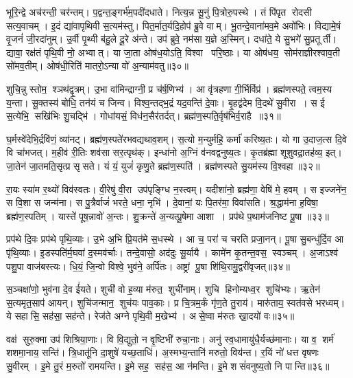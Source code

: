 भूरि॒न्द्वे अच॑रन्ती॒ चर॑न्तम्।
प॒द्वन्त॒ङ्गर्भ॑म॒पदी॑दधाते।
नित्य॒न्न सू॒नुं पि॒त्रोरु॒पस्थे।
तं पि॑पृत रोदसी सत्य॒वाचम्।
इ॒दं द्या॑वापृथिवी स॒त्यम॑स्तु।
पित॒र्मात॒र्यदि॒होप॑ ब्रु॒वे वाम्।
भू॒तन्दे॒वाना॑मव॒मे अवो॑भिः।
विद्यामे॒षं वृ॒जनं॑ जी॒रदा॑नुम्।
उ॒र्वी पृ॒थ्वी ब॑हु॒ले दू॒रे अ॑न्ते।
उप॑ ब्रुवे॒ नम॑सा य॒ज्ञे अ॒स्मिन्।
दधा॑ते॒ ये सु॒भगे॑ सु॒प्रतूर्ती।
द्यावा॒ रक्ष॑तं पृथि॒वी नो॒ अभ्वात्।
या जा॒ता ओष॑ध॒योऽति॒ विश्वा परि॒ष्ठाः।
या ओष॑धय॒ सोम॑राज्ञीरश्वाव॒ती सो॑मव॒तीम्।
ओष॑धी॒रिति॑ मातरो॒ऽन्या वो॑ अ॒न्याम॑वतु॥३०॥\anuvakamend[ह॒विर्नो॑ दाद्भभूव रा॒तिं पू॒र्वहू॑ताव॒र्कैरै॑रद॒स्मिन्पञ्च॑ च]

शुचि॒न्नु स्तोम॒ श्ञथ॑द्वृ॒त्रम्।
उ॒भा वा॑मिन्द्राग्नी॒ प्र च॑र्\mbox{}ष॒णिभ्य॑।
आ वृ॑त्रहणा गी॒र्भिर्विप्र॑।
ब्रह्म॑णस्पते॒ त्वम॒स्य य॒न्ता।
सू॒क्तस्य॑ बोधि॒ तन॑यं च जिन्व।
विश्व॒न्तद्भ॒द्रं यद॒वन्ति॑ दे॒वाः।
बृ॒हद्व॑देम वि॒दथे॑ सु॒वीरा।
स ई स॒त्येभि॒ सखि॑भिः शु॒चद्भि॑।
गोधा॑यसं॒ विध॑न॒सैर॑तर्दत्।
ब्रह्म॑ण॒स्पति॒र्वृष॑भिर्व॒राहै॥३१॥

घ॒र्मस्वे॑देभि॒र्द्रवि॑णं॒ व्या॑नट्।
ब्रह्म॑ण॒स्पते॑रभवद्यथाव॒शम्।
स॒त्यो म॒न्युर्महि॒ कर्मा॑ करिष्य॒तः।
यो गा उ॒दाज॒त्स दि॒वे वि चा॑भजत्।
म॒हीव॑ री॒तिः शव॑सा सर॒त्पृथ॑क्।
इन्धा॑नो अ॒ग्निं व॑नवद्वनुष्य॒तः।
कृ॒तब्र॑ह्मा शूशुवद्रा॒तह॑व्य॒ इत्।
जा॒तेन॑ जा॒तमति॒सृत्प्र सृसते।
यं यं॒ युजं॑ कृणु॒ते ब्रह्म॑ण॒स्पति॑।
ब्रह्म॑णस्पते सु॒यम॑स्य वि॒श्वहा॥३२॥

रा॒यः स्या॑म र॒थ्यो॑ विव॑स्वतः।
वी॒रेषु॑ वी॒रा उप॑पृङ्ग्धि न॒स्त्वम्।
यदीशा॑नो॒ ब्रह्म॑णा॒ वेषि॑ मे॒ हवम्।
स इज्जने॑न॒ स वि॒शा स जन्म॑ना।
स पु॒त्रैर्वाजं॑ भरते॒ धना॒ नृभि॑।
दे॒वानां॒ यः पि॒तर॑मा॒ विवा॑सति।
श्र॒द्धाम॑ना ह॒विषा॒ ब्रह्म॑ण॒स्पतिम्।
यास्ते॑ पूष॒न्नावो॑ अ॒न्तः।
शु॒क्रन्ते॑ अ॒न्यत्पू॒षेमा आशा।
प्रप॑थे प॒थाम॑जनिष्ट पू॒षा ॥३३॥

प्रप॑थे दि॒वः प्रप॑थे पृथि॒व्याः।
उ॒भे अ॒भि प्रि॒यत॑मे स॒धस्थे।
आ च॒ परा॑ च चरति प्रजा॒नन्।
पू॒षा सु॒बन्धु॑र्दि॒व आ पृ॑थि॒व्याः।
इ॒डस्पति॑र्म॒घवा॑ द॒स्मव॑र्चाः।
तन्दे॒वासो॒ अद॑दुः सू॒र्यायै।
कामे॑न कृ॒तन्त॒वस॒ स्वञ्चम्।
अ॒जाऽश्व॑ पशु॒पा वाज॑बस्त्यः।
धि॒यं॒ जि॒न्वो विश्वे॒ भुव॑ने॒ अर्पि॑तः।
अष्ट्रां पू॒षा शि॑थि॒रामु॒द्वरी॑वृजत्॥३४॥

स॒ञ्चक्षा॑णो॒ भुव॑ना दे॒व ई॑यते।
शुची॑ वो ह॒व्या म॑रुत॒ शुची॑नाम्।
शुचि हिनोम्यध्व॒र शुचि॑भ्यः।
ऋ॒तेन॑ स॒त्यमृत॒साप॑ आयन्।
शुचि॑जन्मान॒ शुच॑यः पाव॒काः।
प्र चि॒त्रम॒र्कं गृ॑ण॒ते तु॒राय॑।
मारु॑ताय॒ स्वत॑वसे भरध्वम्।
ये सहासि॒ सह॑सा॒ सह॑न्ते।
रेज॑ते अग्ने पृथि॒वी म॒खेभ्य॑।
असे॒ष्वा म॑रुतः खा॒दयो॑ वः॥३५॥

वक्ष॑ सुरु॒क्मा उप॑ शिश्रिया॒णाः।
वि वि॒द्युतो॒ न वृ॒ष्टिभी॑ रुचा॒नाः।
अनु॑ स्व॒धामायु॑धै॒र्यच्छ॑मानाः।
या व॒ शर्म॑ शशमा॒नाय॒ सन्ति॑।
त्रि॒धातू॑नि दा॒शुषे॑ यच्छ॒ताधि॑।
अ॒स्मभ्य॒न्तानि॑ मरुतो॒ विय॑न्त।
र॒यिं नो॑ धत्त वृषणः सु॒वीरम्।
इ॒मे तु॒रं म॒रुतो॑ रामयन्ति।
इ॒मे सह॒ सह॑स॒ आ न॑मन्ति।
इ॒मे शसं॑वनुष्य॒तो नि पान्ति॥३६॥


